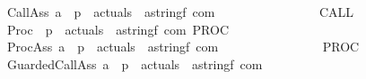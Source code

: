 \begin{isabellebody}
\ \ \ \ \ \ \ {\isachardoublequoteopen}{\isacharunderscore}CallAss{\isachardoublequoteclose}{\isacharcolon}{\isacharcolon}\ {\isachardoublequoteopen}{\isacharprime}a\ {\isasymRightarrow}\ {\isacharprime}p\ {\isasymRightarrow}\ actuals\ {\isasymRightarrow}\ {\isacharparenleft}{\isacharparenleft}{\isacharprime}a{\isacharcomma}string{\isacharcomma}{\isacharprime}f{\isacharparenright}\ com{\isacharparenright}{\isachardoublequoteclose}\ \isanewline
\ \ \ \ \ \ \ \ \ \ \ \ \ {\isacharparenleft}{\isachardoublequoteopen}{\isacharunderscore}\ {\isacharcolon}{\isacharequal}{\isacharequal}\ CALL\ {\isacharunderscore}{\isacharunderscore}{\isachardoublequoteclose}\ {\isacharbrackleft}{}{}{\isacharcomma}{}{}{}{}{\isacharcomma}{}{}{}{}{\isacharbrackright}\ {}{}{\isacharparenright}\isanewline
\ \ \ \ \ \ \ {\isachardoublequoteopen}{\isacharunderscore}Proc{\isachardoublequoteclose}\ {\isacharcolon}{\isacharcolon}\ {\isachardoublequoteopen}{\isacharprime}p\ {\isasymRightarrow}\ actuals\ {\isasymRightarrow}\ {\isacharparenleft}{\isacharparenleft}{\isacharprime}a{\isacharcomma}string{\isacharcomma}{\isacharprime}f{\isacharparenright}\ com{\isacharparenright}{\isachardoublequoteclose}\ {\isacharparenleft}{\isachardoublequoteopen}PROC\ {\isacharunderscore}{\isacharunderscore}{\isachardoublequoteclose}\ {}{}{\isacharparenright}\isanewline
\ \ \ \ \ \ \ {\isachardoublequoteopen}{\isacharunderscore}ProcAss{\isachardoublequoteclose}{\isacharcolon}{\isacharcolon}\ {\isachardoublequoteopen}{\isacharprime}a\ {\isasymRightarrow}\ {\isacharprime}p\ {\isasymRightarrow}\ actuals\ {\isasymRightarrow}\ {\isacharparenleft}{\isacharparenleft}{\isacharprime}a{\isacharcomma}string{\isacharcomma}{\isacharprime}f{\isacharparenright}\ com{\isacharparenright}{\isachardoublequoteclose}\ \isanewline
\ \ \ \ \ \ \ \ \ \ \ \ \ {\isacharparenleft}{\isachardoublequoteopen}{\isacharunderscore}\ {\isacharcolon}{\isacharequal}{\isacharequal}\ PROC\ {\isacharunderscore}{\isacharunderscore}{\isachardoublequoteclose}\ {\isacharbrackleft}{}{}{\isacharcomma}{}{}{}{}{\isacharcomma}{}{}{}{}{\isacharbrackright}\ {}{}{\isacharparenright}\isanewline
\ \ \ \ \ \ \ {\isachardoublequoteopen}{\isacharunderscore}GuardedCallAss{\isachardoublequoteclose}{\isacharcolon}{\isacharcolon}\ {\isachardoublequoteopen}{\isacharprime}a\ {\isasymRightarrow}\ {\isacharprime}p\ {\isasymRightarrow}\ actuals\ {\isasymRightarrow}\ {\isacharparenleft}{\isacharparenleft}{\isacharprime}a{\isacharcomma}string{\isacharcomma}{\isacharprime}f{\isacharparenright}\ com{\isacharparenright}{\isachardoublequoteclose}\ \isanewline

\end{isabellebody}
